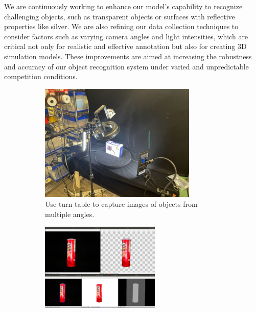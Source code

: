 \documentclass[runningheads,a4paper]{llncs}
\begin{document}
We are continuously working to enhance our model’s capability to recognize challenging objects, such as transparent objects or surfaces with reflective properties like silver.
We are also refining our data collection techniques to consider factors such as varying camera angles and light intensities, which are critical not only for realistic and effective annotation but also for creating 3D simulation models.
These improvements are aimed at increasing the robustness and accuracy of our object recognition system under varied and unpredictable competition conditions.

\begin{figure}[tbp]
	\centering
	\begin{subfigure}[t]{0.42\linewidth}
		\includegraphics[width=1.0\linewidth]{images/dataset1.png}
		\caption{Use turn-table to capture images of objects from multiple angles.}
	\end{subfigure}
	\begin{subfigure}[t]{0.42\linewidth}
		\includegraphics[width=1.0\linewidth]{images/dataset2.png}

\end{subfigure}
\end{figure}
\end{document}
